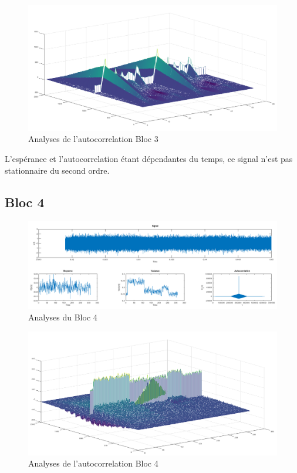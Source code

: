 \documentclass[french, a4paper, 12pt, openany]{book}
\begin{document}
	\begin{figure}[ht]
		\begin{center}
		\includegraphics[scale=0.25]{images/AutoCorrBloc3.png}
		\end{center}
		\caption{Analyses de l'autocorrelation Bloc 3}
		\label{Analyses de l'autocorrelation Bloc 3}
	\end{figure}

	L'espérance et l'autocorrelation étant dépendantes du temps, ce signal n'est pas stationnaire du second ordre.
  \subsection{Bloc 4}

	\begin{figure}[ht]
    \begin{center}
    \includegraphics[scale=0.25]{images/SignalBloc4.png}
    \end{center}
    \caption{Analyses du Bloc 4}
    \label{Analyses du Bloc 4}
  \end{figure}

	\begin{figure}[ht]
		\begin{center}
		\includegraphics[scale=0.25]{images/AutoCorrBloc4.png}
		\end{center}
		\caption{Analyses de l'autocorrelation Bloc 4}
		\label{Analyses de l'autocorrelation Bloc 4}
	\end{figure}
\end{document}
